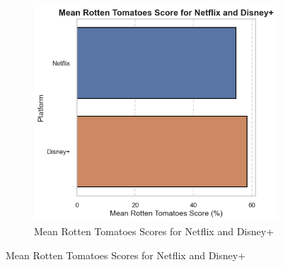 \documentclass[a4paper, 12pt]{article}
\begin{document}
\begin{figure}[H]
\begin{subfigure}[t]{0.48\textwidth}
        \includegraphics[width=\textwidth]{mean_tomato.png}
        \caption{Mean Rotten Tomatoes Scores for Netflix and Disney+}
        \label{fig:mean_tomato}
    \end{subfigure}

    \vspace{0.5cm} %


\end{figure}
\end{document}
